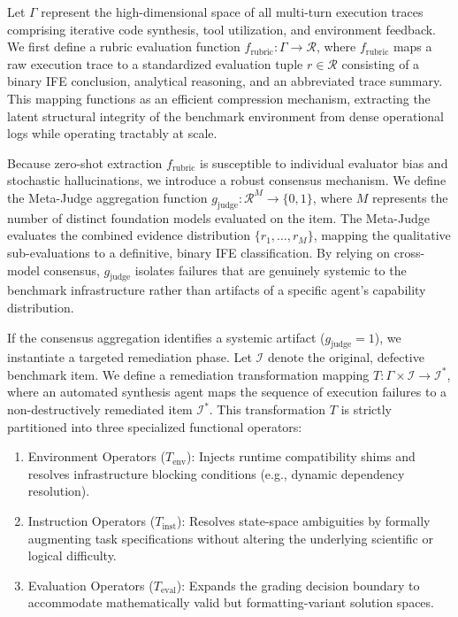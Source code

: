 \documentclass{article}
\theoremstyle{plain}
\theoremstyle{definition}
\theoremstyle{remark}
\begin{document}
Let $\Gamma$ represent the high-dimensional space of all multi-turn execution traces comprising iterative code synthesis, tool utilization, and environment feedback. We first define a rubric evaluation function $f_{\text{rubric}}: \Gamma \rightarrow \mathcal{R}$, where $f_{\text{rubric}}$ maps a raw execution trace to a standardized evaluation tuple $r \in \mathcal{R}$ consisting of a binary IFE conclusion, analytical reasoning, and an abbreviated trace summary. This mapping functions as an efficient compression mechanism, extracting the latent structural integrity of the benchmark environment from dense operational logs while operating tractably at scale. 

Because zero-shot extraction $f_{\text{rubric}}$ is susceptible to individual evaluator bias and stochastic hallucinations, we introduce a robust consensus mechanism. We define the Meta-Judge aggregation function $g_{\text{judge}}: \mathcal{R}^M \rightarrow \{0, 1\}$, where $M$ represents the number of distinct foundation models evaluated on the item. The Meta-Judge evaluates the combined evidence distribution $\{r_1, \dots, r_M\}$, mapping the qualitative sub-evaluations to a definitive, binary IFE classification. By relying on cross-model consensus, $g_{\text{judge}}$ isolates failures that are genuinely systemic to the benchmark infrastructure rather than artifacts of a specific agent's capability distribution.

If the consensus aggregation identifies a systemic artifact ($g_{\text{judge}} = 1$), we instantiate a targeted remediation phase. Let $\mathcal{I}$ denote the original, defective benchmark item. We define a remediation transformation mapping $T: \Gamma \times \mathcal{I} \rightarrow \mathcal{I}^*$, where an automated synthesis agent maps the sequence of execution failures to a non-destructively remediated item $\mathcal{I}^*$. This transformation $T$ is strictly partitioned into three specialized functional operators:
\begin{enumerate}
    \item Environment Operators ($T_{\text{env}}$): Injects runtime compatibility shims and resolves infrastructure blocking conditions (e.g., dynamic dependency resolution).
    \item Instruction Operators ($T_{\text{inst}}$): Resolves state-space ambiguities by formally augmenting task specifications without altering the underlying scientific or logical difficulty.
    \item Evaluation Operators ($T_{\text{eval}}$): Expands the grading decision boundary to accommodate mathematically valid but formatting-variant solution spaces.
\end{enumerate}
\end{document}
